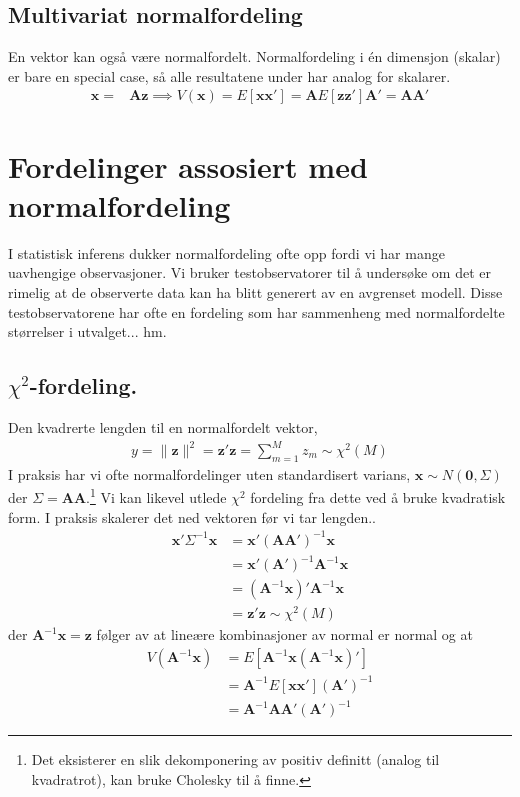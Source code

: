 \subsection{Multivariat normalfordeling}
En vektor kan også være normalfordelt. Normalfordeling i én dimensjon (skalar) er bare en special case, så alle resultatene under har analog for skalarer. 
\begin{align}
\mathbf{x} =& \mathbf{A}\mathbf{z} \implies V(\mathbf{x})=E[\mathbf{x}\mathbf{x}']=\mathbf{A}E[\mathbf{z}\mathbf{z}']\mathbf{A}'=\mathbf{A}\mathbf{A}'
\end{align}
\section{Fordelinger assosiert med normalfordeling}
I statistisk inferens dukker normalfordeling ofte opp fordi vi har mange uavhengige observasjoner. Vi bruker testobservatorer til å undersøke om det er rimelig at de observerte data kan ha blitt generert av en avgrenset modell. Disse testobservatorene har ofte en fordeling som har sammenheng med normalfordelte størrelser i utvalget... hm.
\subsection{$\chi^2$-fordeling.}
Den kvadrerte lengden til en normalfordelt vektor,
\begin{align}
y = \lVert \mathbf{z}\rVert^2=\mathbf{z}'\mathbf{z}=\sum_{m=1}^Mz_m\sim \chi^2(M)
\end{align}
I praksis har vi ofte normalfordelinger uten standardisert varians, $\mathbf{x}\sim N(\mathbf{0}, \Sigma)$ der $\Sigma = \mathbf{A}\mathbf{A}$.\footnote{Det eksisterer en slik dekomponering av positiv definitt (analog til kvadratrot), kan bruke Cholesky til å finne.} Vi kan likevel utlede $\chi^2$ fordeling fra dette ved å bruke kvadratisk form. I praksis skalerer det ned vektoren før vi tar lengden..
\begin{align}
\mathbf{x}'\Sigma^{-1}\mathbf{x}&=\mathbf{x}'(\mathbf{A}\mathbf{A}')^{-1}\mathbf{x} \\
&=\mathbf{x}'(\mathbf{A}')^{-1}\mathbf{A}^{-1}\mathbf{x} \\
&=(\mathbf{A}^{-1}\mathbf{x})'\mathbf{A}^{-1}\mathbf{x} \\
&= \mathbf{z}' \mathbf{z}\sim \chi^2(M)
\end{align}
der $\mathbf{A}^{-1}\mathbf{x}=\mathbf{z}$ følger av at lineære kombinasjoner av normal er normal og at
\begin{align}
V(\mathbf{A}^{-1}\mathbf{x})&=E[\mathbf{A}^{-1}\mathbf{x}(\mathbf{A}^{-1}\mathbf{x})'] \\
&=\mathbf{A}^{-1}E[\mathbf{x}\mathbf{x}'](\mathbf{A}')^{-1} \\
&=\mathbf{A}^{-1}\mathbf{A}\mathbf{A}'(\mathbf{A}')^{-1} 
\end{align}
